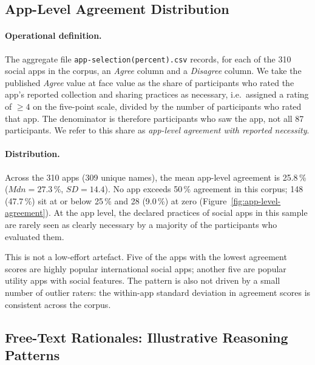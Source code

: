 \documentclass[11pt,a4paper]{article}
\begin{document}
\subsection{App-Level Agreement Distribution}
\label{subsec:app-level-agreement}

\paragraph{Operational definition.} The aggregate file
\texttt{app-selection(percent).csv} records, for each of the 310 social
apps in the corpus, an \emph{Agree} column and a \emph{Disagree}
column. We take the published \emph{Agree} value at face value as the
share of participants who rated the app's reported collection and
sharing practices as necessary, i.e.\ assigned a rating of
$\geq 4$ on the five-point scale, divided by the number of
participants who rated that app. The denominator is therefore
participants who saw the app, not all 87 participants. We refer to
this share as \emph{app-level agreement with reported necessity}.

\paragraph{Distribution.} Across the 310 apps (309 unique names), the
mean app-level agreement is 25.8\,\% ($Mdn=27.3\,\%$, $SD=14.4$).
No app exceeds 50\,\% agreement in this corpus; 148 (47.7\,\%) sit at
or below 25\,\% and 28 (9.0\,\%) at zero
(Figure~\ref{fig:app-level-agreement}). At the app level, the declared
practices of social apps in this sample are rarely seen as clearly
necessary by a majority of the participants who evaluated them.



This is not a low-effort artefact. Five of the apps with the lowest
agreement scores are highly popular international social apps; another
five are popular utility apps with social features. The pattern is also
not driven by a small number of outlier raters: the within-app standard
deviation in agreement scores is consistent across the corpus.

\subsection{Free-Text Rationales: Illustrative Reasoning Patterns}
\label{subsec:qualitative-results}
\end{document}
